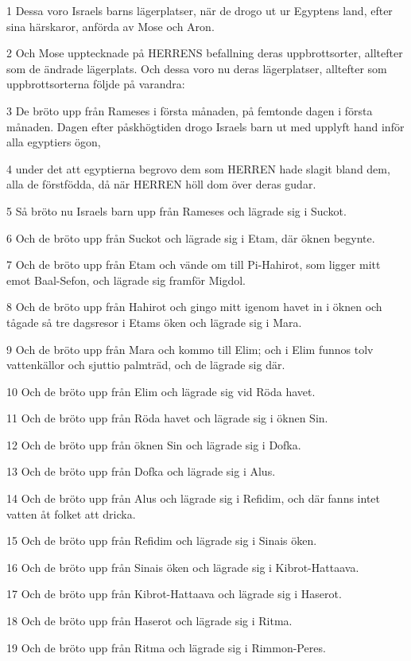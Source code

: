 \par 1 Dessa voro Israels barns lägerplatser, när de drogo ut ur Egyptens land, efter sina härskaror, anförda av Mose och Aron.
\par 2 Och Mose upptecknade på HERRENS befallning deras uppbrottsorter, alltefter som de ändrade lägerplats. Och dessa voro nu deras lägerplatser, alltefter som uppbrottsorterna följde på varandra:
\par 3 De bröto upp från Rameses i första månaden, på femtonde dagen i första månaden. Dagen efter påskhögtiden drogo Israels barn ut med upplyft hand inför alla egyptiers ögon,
\par 4 under det att egyptierna begrovo dem som HERREN hade slagit bland dem, alla de förstfödda, då när HERREN höll dom över deras gudar.
\par 5 Så bröto nu Israels barn upp från Rameses och lägrade sig i Suckot.
\par 6 Och de bröto upp från Suckot och lägrade sig i Etam, där öknen begynte.
\par 7 Och de bröto upp från Etam och vände om till Pi-Hahirot, som ligger mitt emot Baal-Sefon, och lägrade sig framför Migdol.
\par 8 Och de bröto upp från Hahirot och gingo mitt igenom havet in i öknen och tågade så tre dagsresor i Etams öken och lägrade sig i Mara.
\par 9 Och de bröto upp från Mara och kommo till Elim; och i Elim funnos tolv vattenkällor och sjuttio palmträd, och de lägrade sig där.
\par 10 Och de bröto upp från Elim och lägrade sig vid Röda havet.
\par 11 Och de bröto upp från Röda havet och lägrade sig i öknen Sin.
\par 12 Och de bröto upp från öknen Sin och lägrade sig i Dofka.
\par 13 Och de bröto upp från Dofka och lägrade sig i Alus.
\par 14 Och de bröto upp från Alus och lägrade sig i Refidim, och där fanns intet vatten åt folket att dricka.
\par 15 Och de bröto upp från Refidim och lägrade sig i Sinais öken.
\par 16 Och de bröto upp från Sinais öken och lägrade sig i Kibrot-Hattaava.
\par 17 Och de bröto upp från Kibrot-Hattaava och lägrade sig i Haserot.
\par 18 Och de bröto upp från Haserot och lägrade sig i Ritma.
\par 19 Och de bröto upp från Ritma och lägrade sig i Rimmon-Peres.
